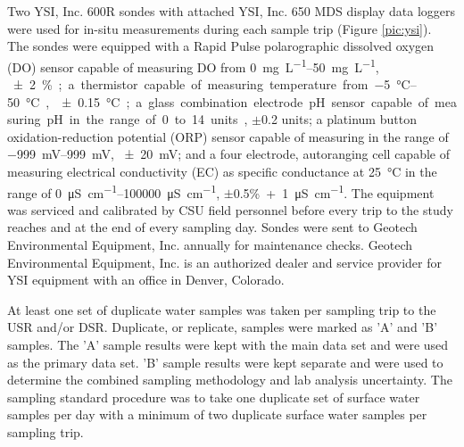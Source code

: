 \begin{linenumbers}
Two YSI, Inc. 600R sondes with attached YSI, Inc. 650 MDS display data loggers were used for in-situ measurements during each sample trip (Figure \ref{pic:ysi}).  The sondes were equipped with a Rapid Pulse polarographic dissolved oxygen (DO) sensor capable of measuring DO from \SIrange{0}{50}{\milli\gram\per\liter}, \SI{\pm2}\%; a thermistor capable of measuring temperature from \SIrange{-5}{50}{\degreeCelsius}, \SI{\pm0.15}{\degreeCelsius}; a glass combination electrode pH sensor capable of measuring pH in the range of 0 to 14 units, $\pm$0.2 units; a platinum button oxidation-reduction potential (ORP) sensor capable of measuring in the range of \SIrange{-999}{999}{\milli\volt}, \SI{\pm20}{\milli\volt}; and a four electrode, autoranging  cell capable of measuring electrical conductivity (EC) as specific conductance at \SI{25}{\degreeCelsius} in the range of \SIrange{0}{100000}{\micro\siemens\per\centi\meter}, $\pm$0.5\%~+~\SI{1}{\micro\siemens\per\centi\meter}.  The equipment was serviced and calibrated by CSU field personnel before every trip to the study reaches and at the end of every sampling day.  Sondes were sent to Geotech Environmental Equipment, Inc. annually for maintenance checks.  Geotech Environmental Equipment, Inc. is an authorized dealer and service provider for YSI equipment with an office in Denver, Colorado.

At least one set of duplicate water samples was taken per sampling trip to the USR and/or DSR.  Duplicate, or replicate, samples were marked as 'A' and 'B' samples.  The 'A' sample results were kept with the main data set and were used as the primary data set.  'B' sample results were kept separate and were used to determine the combined sampling methodology and lab analysis uncertainty.  The sampling standard procedure was to take one duplicate set of surface water samples per day with a minimum of two duplicate surface water samples per sampling trip.


\end{linenumbers}
